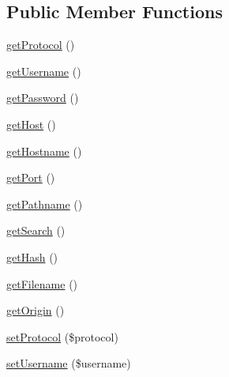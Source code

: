 \subsection*{Public Member Functions}
\begin{DoxyCompactItemize}
\item 
\hyperlink{interface_able_polecat___access_control___resource___locater_interface_ab2caee71cf780f7242c4a5c0261f2b97}{get\+Protocol} ()
\item 
\hyperlink{interface_able_polecat___access_control___resource___locater_interface_a81b37a3c9d639574e394f80c1138c75e}{get\+Username} ()
\item 
\hyperlink{interface_able_polecat___access_control___resource___locater_interface_a04e0957baeb7acde9c0c86556da2d43f}{get\+Password} ()
\item 
\hyperlink{interface_able_polecat___access_control___resource___locater_interface_a39895a44b52bdced039e698588aaf18e}{get\+Host} ()
\item 
\hyperlink{interface_able_polecat___access_control___resource___locater_interface_a62ab2489d5b573dbe83038815c00a283}{get\+Hostname} ()
\item 
\hyperlink{interface_able_polecat___access_control___resource___locater_interface_afd4db46d3c12f47f0bee19cd2101be64}{get\+Port} ()
\item 
\hyperlink{interface_able_polecat___access_control___resource___locater_interface_ac082a4f3ceaf69c24a60704c74a93cbf}{get\+Pathname} ()
\item 
\hyperlink{interface_able_polecat___access_control___resource___locater_interface_aba924be68eb0acbf989e9e68991b2a96}{get\+Search} ()
\item 
\hyperlink{interface_able_polecat___access_control___resource___locater_interface_a10220afb27800deb78f48b4698a74742}{get\+Hash} ()
\item 
\hyperlink{interface_able_polecat___access_control___resource___locater_interface_a2982abe8d7b767602a1485dfb4cf653d}{get\+Filename} ()
\item 
\hyperlink{interface_able_polecat___access_control___resource___locater_interface_ace359404a4a0a42d342fd96f2f3e1a3f}{get\+Origin} ()
\item 
\hyperlink{interface_able_polecat___access_control___resource___locater_interface_ae2238ca228e0bb56ca0ae233893c0b91}{set\+Protocol} (\$protocol)
\item 
\hyperlink{interface_able_polecat___access_control___resource___locater_interface_ac359b701a2ccaff746dd480f03314244}{set\+Username} (\$username)

\end{DoxyCompactItemize}
